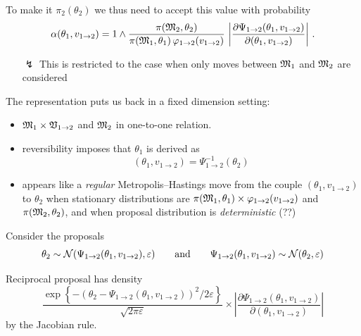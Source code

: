 \begin{slide}
\pause
To make it $\pi_2(\theta_2)$ we thus need to accept this value with probability
$$
\alpha(\theta_1,v_{1\rightarrow 2}) = 1 \wedge \frac{\pi(\mathfrak{M}_2,\theta_2)}
{\pi(\mathfrak{M}_1,\theta_1)\, \varphi_{1\rightarrow 2}(v_{1\rightarrow 2})}\,
\left| \frac{\partial \Psi_{1\rightarrow 2}(\theta_1,v_{1\rightarrow 2})}{
\partial (\theta_1,v_{1\rightarrow 2}) } \right|\,.
$$

\begin{itemize}
\item[$\lightning$] This is restricted to the case when only moves between $\mathfrak{M}_1$ and $\mathfrak{M}_2$
		    are considered
\end{itemize}

\end{slide}\begin{slide}
The representation puts us back in a fixed dimension setting: 

\def\GoV{\mathfrak{V}}
\begin{itemize}
\item $\GoM_1\times\GoV_{1\rightarrow 2}$ and $\mathfrak{M}_2$ in one-to-one relation.
\pause
\item reversibility imposes that $\theta_1$ is derived as
$$
(\theta_1,v_{1\rightarrow 2}) = \Psi_{1\rightarrow 2}^{-1}(\theta_2)
$$
\item appears like a {\em regular} Metropolis--Hastings move from the
couple $(\theta_1,v_{1\rightarrow 2})$ to $\theta_2$ 
when stationary distributions are
$\pi(\mathfrak{M}_1,\theta_1)\times\varphi_{1\rightarrow 2}(v_{1\rightarrow 2})$
and $\pi(\mathfrak{M}_2,\theta_2)$, and when proposal distribution is
{\em deterministic} (??) 
\end{itemize}

\end{slide}\begin{slide}

Consider the proposals
$$
\theta_2\sim{\mathcal N}(\Psi_{1\rightarrow 2}
(\theta_1,v_{1\rightarrow 2}),\varepsilon)
\qquad\hbox{and}\qquad
\Psi_{1\rightarrow 2}(\theta_1,v_{1\rightarrow 2})\sim{\mathcal N}(\theta_2,\varepsilon)
$$

\pause Reciprocal proposal has density
\small$$
\frac{\exp\left\{-(\theta_2-\Psi_{1\rightarrow 2}
(\theta_1,v_{1\rightarrow 2}))^2/2\varepsilon\right\}}{\sqrt{2\pi\varepsilon}}
\times \left| \frac{\partial \Psi_{1\rightarrow 2}(\theta_1,v_{1\rightarrow 2})}{
     \partial (\theta_1,v_{1\rightarrow 2}) }\right|
$$\normalsize
by the Jacobian rule. 


\end{slide}
